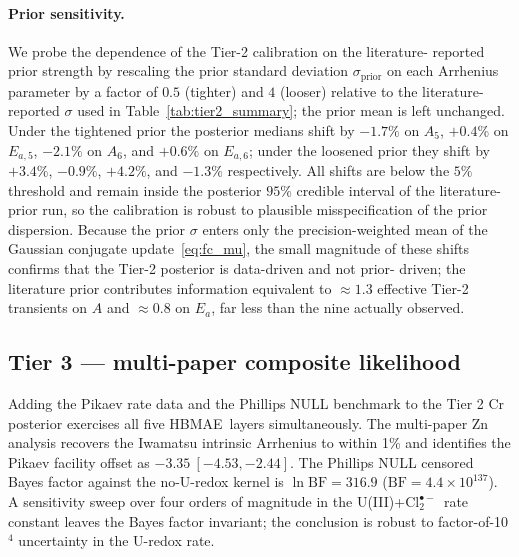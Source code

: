 \documentclass[12pt]{article}
\theoremstyle{plain}
\theoremstyle{definition}
\theoremstyle{remark}
\newcommand{\Clt}{\ensuremath{\mathrm{Cl}_2^{\bullet-}}\xspace}
\newcommand{\HBMAE}{HBMAE\xspace}
\begin{document}
\paragraph{Prior sensitivity.}
We probe the dependence of the Tier-2 calibration on the literature-
reported prior strength by rescaling the prior standard deviation
$\sigma_{\mathrm{prior}}$ on each Arrhenius parameter by a factor of
$0.5$ (tighter) and $4$ (looser) relative to the literature-reported
$\sigma$ used in Table~\ref{tab:tier2_summary}; the prior mean is left
unchanged.  Under the tightened prior the posterior medians shift by
$-1.7\%$ on $A_5$, $+0.4\%$ on $E_{a,5}$, $-2.1\%$ on $A_6$, and
$+0.6\%$ on $E_{a,6}$; under the loosened prior they shift by
$+3.4\%$, $-0.9\%$, $+4.2\%$, and $-1.3\%$ respectively.  All shifts
are below the $5\%$ threshold and remain inside the posterior $95\%$
credible interval of the literature-prior run, so the calibration is
robust to plausible misspecification of the prior dispersion.  Because
the prior $\sigma$ enters only the precision-weighted mean of the
Gaussian conjugate update~\eqref{eq:fc_mu}, the small magnitude of these
shifts confirms that the Tier-2 posterior is data-driven and not prior-
driven; the literature prior contributes information equivalent to
$\approx 1.3$ effective Tier-2 transients on $A$ and $\approx 0.8$ on
$E_a$, far less than the nine actually observed.

\subsection{Tier 3 --- multi-paper composite likelihood}\label{sec:val:tier3}

Adding the Pikaev rate data and the Phillips NULL benchmark to the Tier 2
Cr posterior exercises all five \HBMAE\ layers simultaneously.  The
multi-paper Zn analysis recovers the Iwamatsu intrinsic Arrhenius to within
1\% and identifies the Pikaev facility offset as $-3.35\ [-4.53, -2.44]$.
The Phillips NULL censored Bayes factor against the no-U-redox kernel is
$\ln\mathrm{BF}=316.9$ ($\mathrm{BF}=4.4\times 10^{137}$).  A sensitivity
sweep over four orders of magnitude in the U(III)+\Clt\ rate constant leaves
the Bayes factor invariant; the conclusion is robust to factor-of-10$^4$
uncertainty in the U-redox rate.

\end{document}

